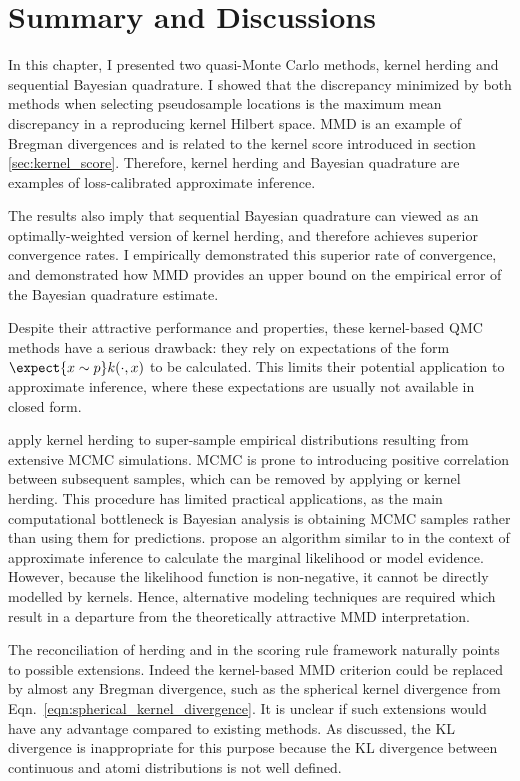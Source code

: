 \section{Summary and Discussions}

In this chapter, I presented two quasi-Monte Carlo methods, kernel herding and sequential Bayesian quadrature. I showed that the discrepancy minimized by both methods when selecting pseudosample locations is the maximum mean discrepancy in a reproducing kernel Hilbert space. MMD is an example of Bregman divergences and is related to the kernel score introduced in section \ref{sec:kernel_score}. Therefore, kernel herding and Bayesian quadrature are examples of loss-calibrated approximate inference.

The results also imply that sequential Bayesian quadrature can viewed as an optimally-weighted version of kernel herding, and therefore achieves superior convergence rates. I empirically demonstrated this superior rate of convergence, and demonstrated how MMD provides an upper bound on the empirical error of the Bayesian quadrature estimate.

Despite their attractive performance and properties, these kernel-based QMC methods have a serious drawback: they rely on expectations of the form $\expect{x\sim p} k(\cdot,x)$ to be calculated. This limits their potential application to approximate inference, where these expectations are usually not available in closed form.

\citet{Chen2012} apply kernel herding to super-sample empirical distributions resulting from extensive MCMC simulations. MCMC is prone to introducing positive correlation between subsequent samples, which can be removed by applying \sbq{} or kernel herding. This procedure has limited practical applications, as the main computational bottleneck is Bayesian analysis is obtaining MCMC samples rather than using them for predictions. \citet{Osborne2012} propose an algorithm similar to \sbq{} in the context of approximate inference to calculate the marginal likelihood or model evidence. However, because the likelihood function is non-negative, it cannot be directly modelled by kernels. Hence, alternative modeling techniques are required which result in a departure from the theoretically attractive MMD interpretation.

The reconciliation of herding and \bq{} in the scoring rule framework naturally points to possible extensions. Indeed the kernel-based MMD criterion could be replaced by almost any Bregman divergence, such as the spherical kernel divergence from Eqn.\ \ref{eqn:spherical_kernel_divergence}. It is unclear if such extensions would have any advantage compared to existing methods. As discussed, the KL divergence is inappropriate for this purpose because the KL divergence between continuous and atomi distributions is not well defined.

